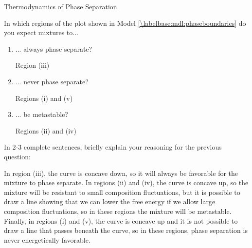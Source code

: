\begin{activity}{Thermodynamics of Phase Separation}
\begin{ctqs}
	\question In which regions of the plot shown in Model \ref{\labelbase:mdl:phaseboundaries} do you expect mixtures to...
		\begin{enumerate}
			\item ... always phase separate?
			
				\begin{solution}[0.5in]
				
					Region (iii)
				
				\end{solution}
			
			\item ... never phase separate?
			
				\begin{solution}[0.5in]
				
					Regions (i) and (v)
				
				\end{solution}
			
			\item ... be metastable?
			
				\begin{solution}[0.5in]
				
					Regions (ii) and (iv)
				
				\end{solution}
				
		\end{enumerate}
		
	\question In 2-3 complete sentences, briefly explain your reasoning for the previous question:
			
				\begin{solution}[2in]
				
					In region (iii), the curve is concave down, so it will always be favorable for the mixture to phase separate.  In regions (ii) and (iv), the curve is concave up, so the mixture will be resistant to small composition fluctuations, but it is possible to draw a line showing that we can lower the free energy if we allow large composition fluctuations, so in these regions the mixture will be metastable.  Finally, in regions (i) and (v), the curve is concave up and it is not possible to draw a line that passes beneath the curve, so in these regions, phase separation is never energetically favorable.
				
				\end{solution}
				
\end{ctqs}


\end{activity}
